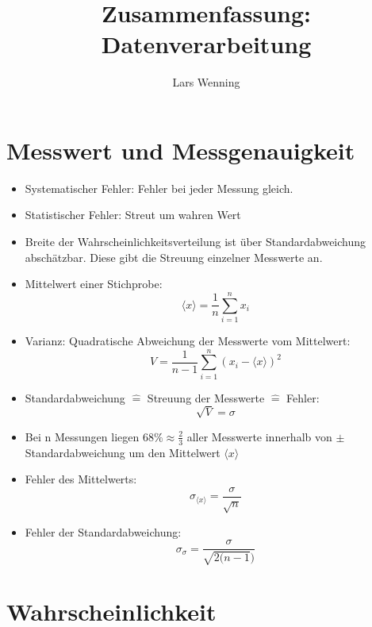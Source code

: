 \documentclass[10pt,a4paper]{article}
\author{Lars Wenning}
\title{Zusammenfassung: Datenverarbeitung}
\begin{document}
\maketitle

\newpage
\tableofcontents

\newpage
\section{Messwert und Messgenauigkeit}
\begin{itemize}
\item Systematischer Fehler: Fehler bei jeder Messung gleich.
\item Statistischer Fehler: Streut um wahren Wert
\item Breite der Wahrscheinlichkeitsverteilung ist über Standardabweichung abschätzbar. Diese gibt die Streuung einzelner Messwerte an.
\item Mittelwert einer Stichprobe:
\begin{equation}
\langle x \rangle= \frac{1}{n} \sum^{n}_{i=1}x_i
\end{equation}
\item Varianz: Quadratische Abweichung der Messwerte vom Mittelwert:
\begin{equation}
V= \frac{1}{n-1} \sum^{n}_{i=1} (x_i- \langle x \rangle)^2
\end{equation}
\item Standardabweichung $\widehat{=}$ Streuung der Messwerte $\widehat{=}$ Fehler:
\begin{equation}
\sqrt{V}=\sigma
\end{equation}
\item Bei n Messungen liegen $ 68 \% \approx \frac{2}{3}$ aller Messwerte innerhalb von $\pm$ Standardabweichung um den Mittelwert $\langle x \rangle$
\item Fehler des Mittelwerts:
\begin{equation}
\sigma_{\langle x \rangle} = \frac{\sigma}{\sqrt{n}}
\end{equation}
\item Fehler der Standardabweichung:
\begin{equation}
\sigma_\sigma=\frac{\sigma}{\sqrt{2(n-1})}
\end{equation}
\end{itemize}
\newpage


\section{Wahrscheinlichkeit}
\end{document}
